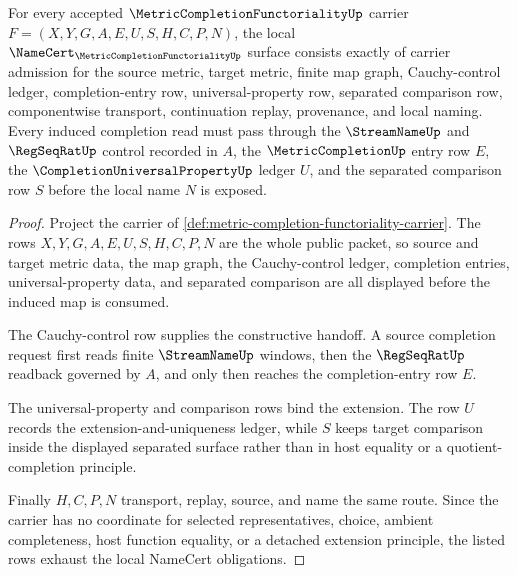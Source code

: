 \begin{theorem}
\label{thm:metric-completion-functoriality-namecert-obligations}
For every accepted $\MetricCompletionFunctorialityUp$ carrier $F=(X,Y,G,A,E,U,S,H,C,P,N)$, the local $\NameCert_{\MetricCompletionFunctorialityUp}$ surface consists exactly of carrier admission for the source metric, target metric, finite map graph, Cauchy-control ledger, completion-entry row, universal-property row, separated comparison row, componentwise transport, continuation replay, provenance, and local naming. Every induced completion read must pass through the $\StreamNameUp$ and $\RegSeqRatUp$ control recorded in $A$, the $\MetricCompletionUp$ entry row $E$, the $\CompletionUniversalPropertyUp$ ledger $U$, and the separated comparison row $S$ before the local name $N$ is exposed.
\end{theorem}
\begin{proof}
Project the carrier of \autoref{def:metric-completion-functoriality-carrier}. The rows $X,Y,G,A,E,U,S,H,C,P,N$ are the whole public packet, so source and target metric data, the map graph, the Cauchy-control ledger, completion entries, universal-property data, and separated comparison are all displayed before the induced map is consumed.

The Cauchy-control row supplies the constructive handoff. A source completion request first reads finite $\StreamNameUp$ windows, then the $\RegSeqRatUp$ readback governed by $A$, and only then reaches the completion-entry row $E$.

The universal-property and comparison rows bind the extension. The row $U$ records the extension-and-uniqueness ledger, while $S$ keeps target comparison inside the displayed separated surface rather than in host equality or a quotient-completion principle.

Finally $H,C,P,N$ transport, replay, source, and name the same route. Since the carrier has no coordinate for selected representatives, choice, ambient completeness, host function equality, or a detached extension principle, the listed rows exhaust the local NameCert obligations.
\end{proof}

